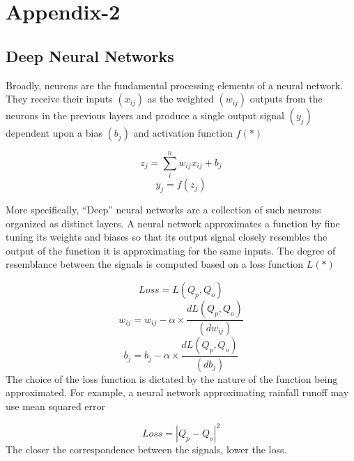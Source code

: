 
\chapter{Appendix-2}\label{Appendix-2}
\section{Deep Neural Networks}\label{SI:neuralnets}
Broadly, neurons are the fundamental processing elements of a neural network.
They receive their inputs $(x_{ij})$ as the weighted $(w_{ij})$ outputs from the neurons in the previous layers and produce a single output signal $(y_j)$ dependent upon a bias $(b_j)$ and activation function $f(*)$

\begin{equation}
      z_j = \sum_i^n w_{ij}  x_{ij}+b_j
\end{equation}
\begin{equation}
    y_j = f(z_j)
\end{equation}

More specifically, “Deep” neural networks are a collection of such neurons organized as distinct layers.
A neural network approximates a function by fine tuning its weights and biases so that its output signal closely resembles the output of the function it is approximating for the same inputs.
The degree of resemblance between the signals is computed based on a loss function $L(*)$

\begin{equation}
    Loss = L(Q_p,Q_o)
\end{equation}
\begin{equation}
    w_{ij} = w_{ij}- \alpha \times  \frac{dL(Q_p,Q_o )}{(dw_{ij})}
\end{equation}
\begin{equation}
    b_j = b_j- \alpha \times  \frac{dL(Q_p,Q_o )}{(db_j)}
\end{equation}
The choice of the loss function is dictated by the nature of the function being approximated.
For example, a neural network approximating rainfall runoff may use mean squared error\cite{tokar1999rainfall}

\begin{equation}
    Loss = |Q_p-Q_o|^2
\end{equation}
The closer the correspondence between the signals, lower the loss.

\

